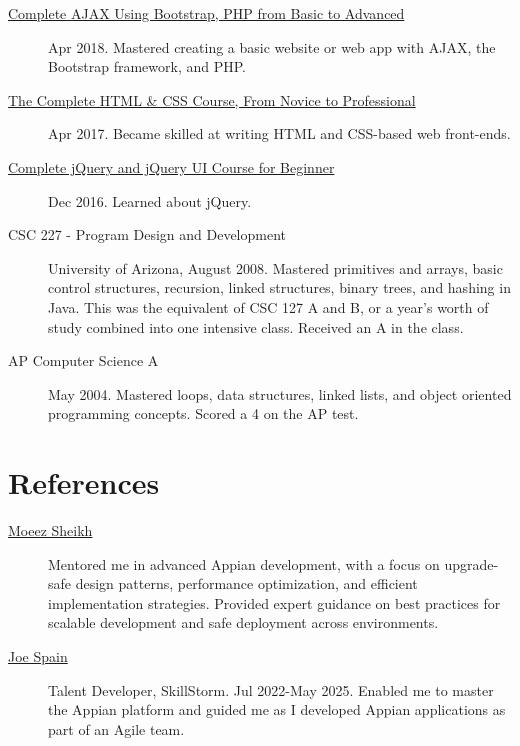 \documentclass{article}
\begin{document}
\begin{description}
  \item [\href{https://www.udemy.com/certificate/UC-E3EMJE4O}{Complete AJAX Using Bootstrap, PHP from Basic to Advanced}] Apr 2018. Mastered creating a basic website or web app with AJAX, the Bootstrap framework, and PHP.
  \item [\href{https://www.udemy.com/certificate/UC-QZDWYX3V}{The Complete HTML \& CSS Course, From Novice to Professional}] Apr 2017. Became skilled at writing HTML and CSS-based web front-ends.
  \item [\href{https://www.udemy.com/certificate/UC-4V285L2N}{Complete jQuery and jQuery UI Course for Beginner}] Dec 2016. Learned about jQuery.
  \item [CSC 227 - Program Design and Development] University of Arizona, August 2008. Mastered primitives and arrays, basic control structures, recursion, linked structures, binary trees, and hashing in Java. This was the equivalent of CSC 127 A and B, or a year's worth of study combined into one intensive class. Received an A in the class.
  \item [AP Computer Science A] May 2004. Mastered loops, data structures, linked lists, and object oriented programming concepts. Scored a 4 on the AP test.
\end{description}

\vspace{-1em}
\section*{References}\vspace{-0.5em}
\begin{description}
  \item [\href{https://www.linkedin.com/in/moeezsheikh/}{Moeez Sheikh}] Mentored me in advanced Appian development, with a focus on upgrade-safe design patterns, performance optimization, and efficient implementation strategies. Provided expert guidance on best practices for scalable development and safe deployment across environments. 
  \item [\href{https://www.linkedin.com/in/joespain/}{Joe Spain}] Talent Developer, SkillStorm. Jul 2022-May 2025. Enabled me to master the Appian platform and guided me as I developed Appian applications as part of an Agile team.
\end{description}
\end{document}

